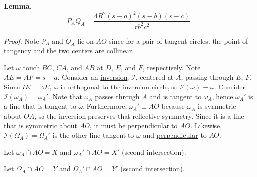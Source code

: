 \begin{enumerate}
 \textbf{Lemma.}
 \[P_{A}Q_{A}=\frac{ 4R^{2}(s-a)^{2}(s-b)(s-c)}{rb^{2}c^{2}}\]

 \textit{Proof.} Note $P_{A}$ and $Q_{A}$ lie on $AO$ since for a pair of tangent circles, the point of tangency and the two centers are \href{https://artofproblemsolving.com/wiki/index.php?title=Collinear}{collinear}. 

 Let $\omega$ touch $BC$, $CA$, and $AB$ at $D$, $E$, and $F$, respectively. Note $AE=AF=s-a$. Consider an \href{https://artofproblemsolving.com/wiki/index.php?title=Inversion}{inversion}, $\mathcal{I}$, centered at $A$, passing through $E$, $F$. Since $IE\perp AE$, $\omega$ is \href{https://artofproblemsolving.com/wiki/index.php?title=Orthogonal&action=edit&redlink=1}{orthogonal} to the inversion circle, so $\mathcal{I}(\omega)=\omega$. Consider $\mathcal{I}(\omega_{A})=\omega_{A}'$. Note that $\omega_{A}$ passes through $A$ and is tangent to $\omega_{A}$, hence $\omega_{A}'$ is a line that is tangent to $\omega$. Furthermore, $\omega_{A}'\perp AO$ because $\omega_{A}$ is symmetric about $OA$, so the inversion preserves that reflective symmetry. Since it is a line that is symmetric about $AO$, it must be perpendicular to $AO$. Likewise, $\mathcal{I}(\Omega_{A})=\Omega_{A}'$ is the other line tangent to $\omega$ and \href{https://artofproblemsolving.com/wiki/index.php?title=Perpendicular}{perpendicular} to $AO$. 

 Let $\omega_{A} \cap AO=X$ and $\omega_{A}' \cap AO=X'$ (second intersection).

 Let $\Omega_{A} \cap AO=Y$ and $\Omega_{A}' \cap AO=Y'$ (second intersection).


\end{enumerate}

